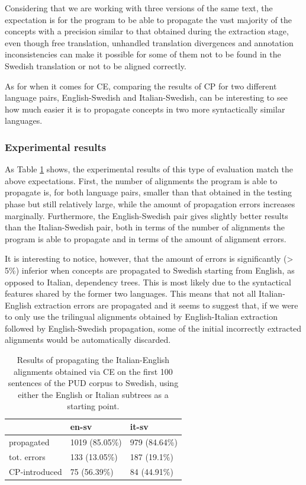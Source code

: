 Considering that we are working with three versions of the same text, the expectation is for the program to be able to propagate the vast majority of the concepts with a precision similar to that obtained during the extraction stage, even though free translation, unhandled translation divergences and annotation inconsistencies can make it possible for some of them not to be found in the Swedish translation or not to be aligned correctly. \smallskip

As for when it comes for CE, comparing the results of CP for two different language pairs, English-Swedish and Italian-Swedish, can be interesting to see how much easier it is to propagate concepts in two more syntactically similar languages.

\subsubsection{Experimental results}
As Table \ref{tcp1} shows, the experimental results of this type of evaluation match the above expectations. First, the number of alignments the program is able to propagate is, for both language pairs, smaller than that obtained in the testing phase but still relatively large, while the amount of propagation errors increases marginally. Furthermore, the English-Swedish pair gives slightly better results than the Italian-Swedish pair, both in terms of the number of alignments the program is able to propagate and in terms of the amount of alignment errors. \smallskip

It is interesting to notice, however, that the amount of errors is significantly (> 5\%) inferior when concepts are propagated to Swedish starting from English, as opposed to Italian, dependency trees. This is most likely due to the syntactical features shared by the former two languages. This means that not all Italian-English extraction errors are propagated and it seems to suggest that, if we were to only use the trilingual alignments obtained by English-Italian extraction followed by English-Swedish propagation, some of the initial incorrectly extracted alignments would be automatically discarded.

\begin{table}[H]
    \centering
    \begin{tabular}{|l|l|l|}
    \hline
    \textbf{}              & \textbf{en-sv} & \textbf{it-sv} \\ \hline
    propagated             & 1019 (85.05\%) & 979 (84.64\%) \\ \hline
    tot. errors            & 133 (13.05\%)  & 187 (19.1\%)  \\ \hline
    CP-introduced          & 75 (56.39\%)   & 84 (44.91\%)   \\ \hline
    \end{tabular}
    \caption[Performance of CP Scenario 1 on manually annotated data]{Results of propagating the Italian-English alignments obtained via CE on the first 100 sentences of the PUD corpus to Swedish, using either the English or Italian subtrees as a starting point.}
    \label{tcp1}
    \end{table}

